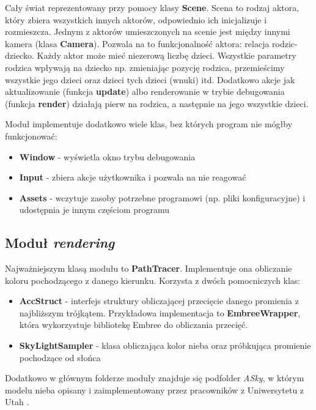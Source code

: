 \documentclass[inz,longabstract]{iithesis}
\begin{document}
            Cały świat reprezentowany przy pomocy klasy \textbf{Scene}. Scena to rodzaj aktora, który zbiera wszystkich innych aktorów, odpowiednio ich inicjalizuje i rozmieszcza. Jednym z aktorów umieszczonych na scenie jest między innymi kamera (klasa \textbf{Camera}). Pozwala na to funkcjonalność aktora: relacja rodzic-dziecko. Każdy aktor może mieć niezerową liczbę dzieci. Wszystkie parametry rodzica wpływają na dziecko np. zmieniając pozycję rodzica, przemieścimy wszystkie jego dzieci oraz dzieci tych dzieci (wnuki) itd. Dodatkowo akcje jak aktualizowanie (funkcja \textbf{update}) albo renderowanie w trybie debugowania (funkcja \textbf{render}) działają pierw na rodzica, a następnie na jego wszystkie dzieci.
            
            Moduł implementuje dodatkowo wiele klas, bez których program nie mógłby funkcjonować:
            \begin{itemize}
                \item \textbf{Window} - wyświetla okno trybu debugowania
                \item \textbf{Input} - zbiera akcje użytkownika i pozwala na nie reagować
                \item \textbf{Assets} - wczytuje zasoby potrzebne programowi (np. pliki konfiguracyjne) i udostępnia je innym częściom programu 
            \end{itemize}
            
        \subsection{Moduł \textit{rendering}}
            Najważniejszym klasą modułu to \textbf{PathTracer}. Implementuje ona obliczanie koloru pochodzącego z danego kierunku. Korzysta z dwóch pomocniczych klas:
            \begin{itemize}
                \item \textbf{AccStruct} - interfejs struktury obliczającej przecięcie danego promienia z najbliższym trójkątem. Przykładowa implementacja to \textbf{EmbreeWrapper}, która wykorzystuje bibliotekę Embree do obliczania przecięć. 
                \item \textbf{SkyLightSampler} - klasa obliczająca kolor nieba oraz próbkująca promienie pochodzące od słońca
            \end{itemize}
            
            Dodatkowo w głównym folderze moduły znajduje się podfolder \textit{ASky}, w którym modelu nieba opisany i zaimplementowany przez pracowników z Uniwersytetu z Utah \cite{sky}.
            
\end{document}
